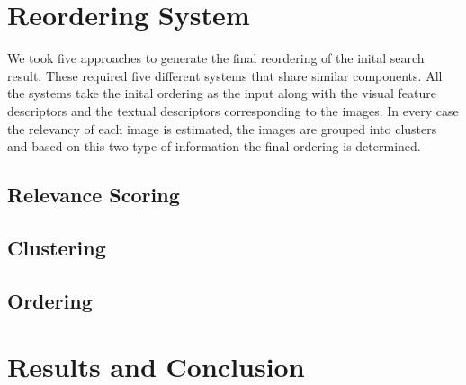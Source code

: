 \documentclass{acm_proc_article-me}
\begin{document}
\section{Reordering System}

We took five approaches to generate the final reordering of the inital search result. These required five different systems that share similar components. All the systems take the inital ordering as the input along with the visual feature descriptors and the textual descriptors corresponding to the images. In every case the relevancy of each image is estimated, the images are grouped into clusters and based on this two type of information the final ordering is determined.

\subsection{Relevance Scoring}



\subsection{Clustering}

\subsection{Ordering}

\section{Results and Conclusion}

\end{document}

